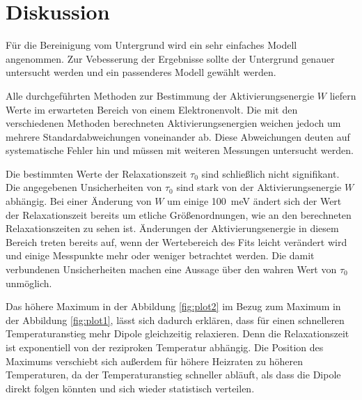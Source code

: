 \section{Diskussion}
\label{sec:Diskussion}

Für die Bereinigung vom Untergrund wird ein sehr einfaches Modell angenommen.
Zur Vebesserung der Ergebnisse sollte der Untergrund genauer untersucht werden und ein passenderes Modell gewählt werden.

Alle durchgeführten Methoden zur Bestimmung der Aktivierungsenergie $W$
liefern Werte im erwarteten Bereich von einem Elektronenvolt.
Die mit den verschiedenen Methoden berechneten Aktivierungsenergien weichen jedoch um mehrere Standardabweichungen voneinander ab.
Diese Abweichungen deuten auf systematische Fehler hin und müssen mit weiteren Messungen untersucht werden.

Die bestimmten Werte der Relaxationszeit $\tau_0$ sind schließlich nicht signifikant.
Die angegebenen Unsicherheiten von $\tau_0$ sind stark von der Aktivierungsenergie $W$ abhängig.
Bei einer Änderung von $W$ um einige \SI{100}{\milli\electronvolt} ändert
sich der Wert der Relaxationszeit bereits um etliche Größenordnungen, wie an den berechneten Relaxationszeiten zu sehen ist.
Änderungen der Aktivierungsenergie in diesem Bereich treten bereits auf, wenn der Wertebereich des Fits leicht verändert wird und einige Messpunkte mehr oder weniger betrachtet werden.
Die damit verbundenen Unsicherheiten machen eine Aussage über den wahren Wert von
$\tau_0$ unmöglich.

Das höhere Maximum in der Abbildung \ref{fig:plot2} im Bezug zum Maximum in der Abbildung \ref{fig:plot1}, lässt
sich dadurch erklären, dass für einen schnelleren Temperaturanstieg mehr Dipole gleichzeitig relaxieren.
Denn die Relaxationszeit ist exponentiell von der reziproken Temperatur abhängig.
Die Position des Maximums verschiebt sich außerdem für höhere Heizraten zu höheren Temperaturen, da der Temperaturanstieg
schneller abläuft, als dass die Dipole direkt folgen könnten und sich wieder statistisch verteilen.
